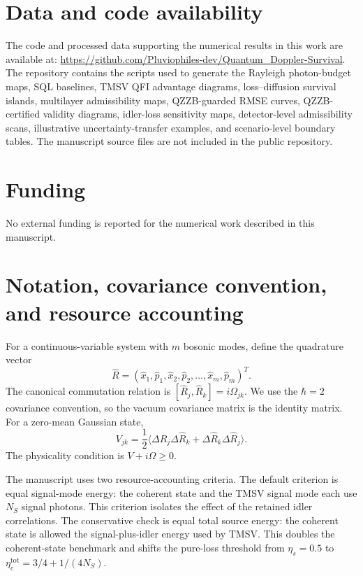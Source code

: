\documentclass[a4paper,11pt]{article}
\numberwithin{equation}{section}
\newcommand{\Ns}{N_{S}}
\newcommand{\etas}{\eta_s}
\newcommand{\repoURL}{\url{https://github.com/Pluviophiles-dev/Quantum_Doppler-Survival}}
\begin{document}
\section*{Data and code availability}
The code and processed data supporting the numerical results in this work are available at: \repoURL. The repository contains the scripts used to generate the Rayleigh photon-budget maps, SQL baselines, TMSV QFI advantage diagrams, loss--diffusion survival islands, multilayer admissibility maps, QZZB-guarded RMSE curves, QZZB-certified validity diagrams, idler-loss sensitivity maps, detector-level admissibility scans, illustrative uncertainty-transfer examples, and scenario-level boundary tables. The manuscript source files are not included in the public repository.

\section*{Funding}
No external funding is reported for the numerical work described in this manuscript.

\appendix

\section{Notation, covariance convention, and resource accounting}
\label{app:notation}

For a continuous-variable system with $m$ bosonic modes, define the quadrature vector
\begin{equation}
  \hat R=(\hat x_1,\hat p_1,\hat x_2,\hat p_2,\ldots,\hat x_m,\hat p_m)^T.
\end{equation}
The canonical commutation relation is $[\hat R_j,\hat R_k]=i\Omega_{jk}$. We use the $\hbar=2$ covariance convention, so the vacuum covariance matrix is the identity matrix. For a zero-mean Gaussian state,
\begin{equation}
  V_{jk}=\frac{1}{2}\langle \Delta \hat R_j\Delta \hat R_k+\Delta \hat R_k\Delta \hat R_j\rangle.
\end{equation}
The physicality condition is $V+i\Omega\ge0$.

The manuscript uses two resource-accounting criteria. The default criterion is equal signal-mode energy: the coherent state and the TMSV signal mode each use $\Ns$ signal photons. This criterion isolates the effect of the retained idler correlations. The conservative check is equal total source energy: the coherent state is allowed the signal-plus-idler energy used by TMSV. This doubles the coherent-state benchmark and shifts the pure-loss threshold from $\etas=0.5$ to $\eta_c^{\mathrm{tot}}=3/4+1/(4\Ns)$.
\end{document}
